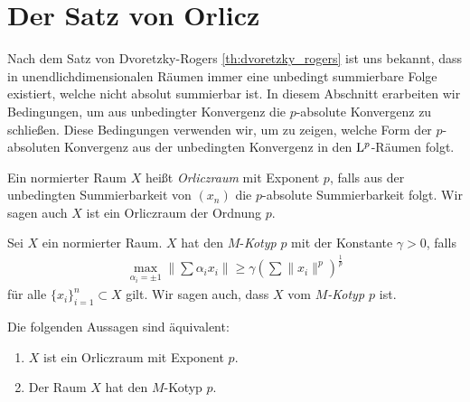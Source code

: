 \section{Der Satz von Orlicz}\label{sc:lemma_of_orlicz}
Nach dem Satz von Dvoretzky-Rogers \ref{th:dvoretzky_rogers} ist uns bekannt, dass in unendlichdimensionalen Räumen immer eine unbedingt summierbare Folge existiert, welche nicht absolut summierbar ist.
In diesem Abschnitt erarbeiten wir Bedingungen, um aus unbedingter Konvergenz die $ p $-absolute Konvergenz zu schließen.
Diese Bedingungen verwenden wir, um zu zeigen, welche Form der $ p $-absoluten Konvergenz aus der unbedingten Konvergenz in den $ \mathrm{L}^p $-Räumen folgt.

\begin{df}
	Ein normierter Raum $ X $ heißt \textit{Orliczraum} mit Exponent $ p $,
	falls aus der unbedingten Summierbarkeit von $ (x_n) $ die 
	$ p $-absolute Summierbarkeit folgt.
	Wir sagen auch $ X $ ist ein Orliczraum der Ordnung $ p $.
\end{df}


\begin{df}
	Sei $ X $ ein normierter Raum. $ X $ hat den $ M $-\textit{Kotyp} $ p $ mit der Konstante $ \gamma > 0 $, falls
	\begin{align}\label{eq:m_kotyp_ineq_1}
		\max \limits_{\alpha_i = \pm 1}
		\left\|
		\sum \alpha_i x_i
		\right\|
		\geq
		\gamma
		\left(\sum \| x_i\|^p\right)^\frac{1}{p}
	\end{align}
	für alle $ \{x_i\}_{i=1}^n \subset X $ gilt.
	Wir sagen auch, dass $ X $ vom \textit{$ M $-Kotyp $ p $} ist.
\end{df}

\begin{sz}\label{th:orlicz_equi_kotyp}
	Die folgenden Aussagen sind äquivalent:
	\begin{enumerate}
		\item 
		$ X $ ist ein Orliczraum mit Exponent $ p $.
		\item 
		Der Raum $ X $ hat den $ M $-Kotyp $ p $.
	\end{enumerate}
\end{sz}

